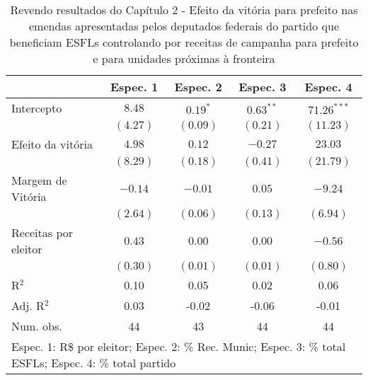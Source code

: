 
\begin{table}
\caption{Revendo resultados do Capítulo 2 - Efeito da vitória para prefeito nas emendas apresentadas pelos deputados federais do partido que beneficiam ESFLs controlando por receitas de campanha para prefeito e para unidades próximas à fronteira}
\begin{center}
\begin{tabular}{l c c c c }
\hline
                     & Espec. 1 & Espec. 2 & Espec. 3 & Espec. 4 \\
\hline
Intercepto           & $8.48$   & $0.19^{*}$ & $0.63^{**}$ & $71.26^{***}$ \\
                     & $(4.27)$ & $(0.09)$   & $(0.21)$    & $(11.23)$     \\
Efeito da vitória    & $4.98$   & $0.12$     & $-0.27$     & $23.03$       \\
                     & $(8.29)$ & $(0.18)$   & $(0.41)$    & $(21.79)$     \\
Margem de Vitória    & $-0.14$  & $-0.01$    & $0.05$      & $-9.24$       \\
                     & $(2.64)$ & $(0.06)$   & $(0.13)$    & $(6.94)$      \\
Receitas por eleitor & $0.43$   & $0.00$     & $0.00$      & $-0.56$       \\
                     & $(0.30)$ & $(0.01)$   & $(0.01)$    & $(0.80)$      \\
\hline
R$^2$                & 0.10     & 0.05       & 0.02        & 0.06          \\
Adj. R$^2$           & 0.03     & -0.02      & -0.06       & -0.01         \\
Num. obs.            & 44       & 43         & 44          & 44            \\
\hline
\multicolumn{5}{l}{\scriptsize{Espec. 1: R\$ por eleitor; Espec. 2: \% Rec. Munic; Espec. 3: \% total ESFLs; Espec. 4: \% total partido}}
\end{tabular}
\label{tab:c4t7}
\end{center}
\end{table}

